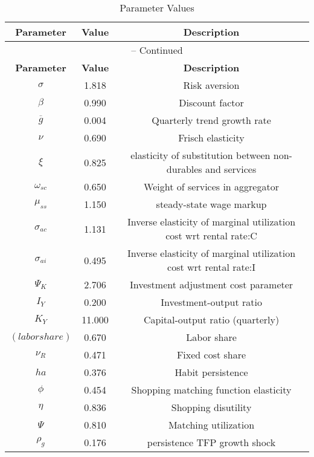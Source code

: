 \begin{center}
\begin{longtable}{ccc}
\caption{Parameter Values}\\%
\toprule%
\multicolumn{1}{c}{\textbf{Parameter}} &
\multicolumn{1}{c}{\textbf{Value}} &
 \multicolumn{1}{c}{\textbf{Description}}\\%
\midrule%
\endfirsthead
\multicolumn{3}{c}{{\tablename} \thetable{} -- Continued}\\%
\midrule%
\multicolumn{1}{c}{\textbf{Parameter}} &
\multicolumn{1}{c}{\textbf{Value}} &
  \multicolumn{1}{c}{\textbf{Description}}\\%
\midrule%
\endhead
${\sigma}$ 	 & 	 1.818 	 & 	 Risk aversion\\
${\beta}$ 	 & 	 0.990 	 & 	 Discount factor\\
${\overline{g}}$ 	 & 	 0.004 	 & 	 Quarterly trend growth rate\\
$\nu$ 	 & 	 0.690 	 & 	 Frisch elasticity\\
$\xi$ 	 & 	 0.825 	 & 	 elasticity of substitution between non-durables and services\\
$\omega_{sc}$ 	 & 	 0.650 	 & 	 Weight of services in aggregator\\
$\mu_{ss}$ 	 & 	 1.150 	 & 	 steady-state wage markup\\
${\sigma_{ac}}$ 	 & 	 1.131 	 & 	 Inverse elasticity of marginal utilization cost wrt rental rate:C\\
${\sigma_{ai}}$ 	 & 	 0.495 	 & 	 Inverse elasticity of marginal utilization cost wrt rental rate:I\\
${\Psi_{K}}$ 	 & 	 2.706 	 & 	 Investment adjustment cost parameter\\
${I_Y}$ 	 & 	 0.200 	 & 	 Investment-output ratio\\
${K_Y}$ 	 & 	 11.000 	 & 	 Capital-output ratio (quarterly)\\
$(labor share)$ 	 & 	 0.670 	 & 	 Labor share\\
${\nu_R}$ 	 & 	 0.471 	 & 	 Fixed cost share\\
${ha}$ 	 & 	 0.376 	 & 	 Habit persistence\\
${\phi}$ 	 & 	 0.454 	 & 	 Shopping matching function elasticity\\
${\eta}$ 	 & 	 0.836 	 & 	 Shopping disutility\\
${\Psi}$ 	 & 	 0.810 	 & 	 Matching utilization\\
${\rho_g}$ 	 & 	 0.176 	 & 	 persistence TFP growth shock\\

\end{longtable}
\end{center}
